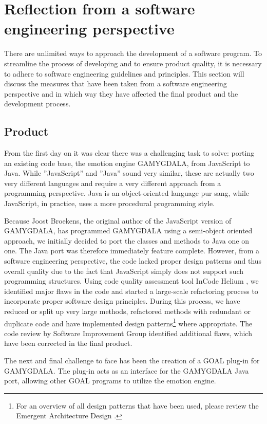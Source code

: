 \section{Reflection from a software engineering perspective}
There are unlimited ways to approach the development of a software program. To streamline the process of developing and to ensure product quality, it is necessary to adhere to software engineering guidelines and principles. This section will discuss the measures that have been taken from a software engineering perspective and in which way they have affected the final product and the development process.


\subsection{Product}
From the first day on it was clear there was a challenging task to solve: porting an existing code base, the emotion engine GAMYGDALA, from JavaScript to Java. While ''JavaScript'' and ''Java'' sound very similar, these are actually two very different languages and require a very different approach from a programming perspective. Java is an object-oriented language pur sang, while JavaScript, in practice, uses a more procedural programming style.

Because Joost Broekens, the original author of the JavaScript version of GAMYGDALA, has programmed GAMYGDALA using a semi-object oriented approach, we initially decided to port the classes and methods to Java one on one. The Java port was therefore immediately feature complete. However, from a software engineering perspective, the code lacked proper design patterns and thus overall quality due to the fact that JavaScript simply does not support such  programming structures. Using code quality assessment tool InCode Helium \citep{incode}, we identified major flaws in the code and started a large-scale refactoring process to incorporate proper software design principles. During this process, we have reduced or split up very large methods, refactored methods with redundant or duplicate code and have implemented design patterns\footnote{For an overview of all design patterns that have been used, please review the Emergent Architecture Design \citep{ead}.} where appropriate. The code review by Software Improvement Group identified additional flaws, which have been corrected in the final product.

The next and final challenge to face has been the creation of a GOAL \citep{goal} plug-in for GAMYGDALA. The plug-in acts as an interface for the GAMYGDALA Java port, allowing other GOAL programs to utilize the emotion engine.

